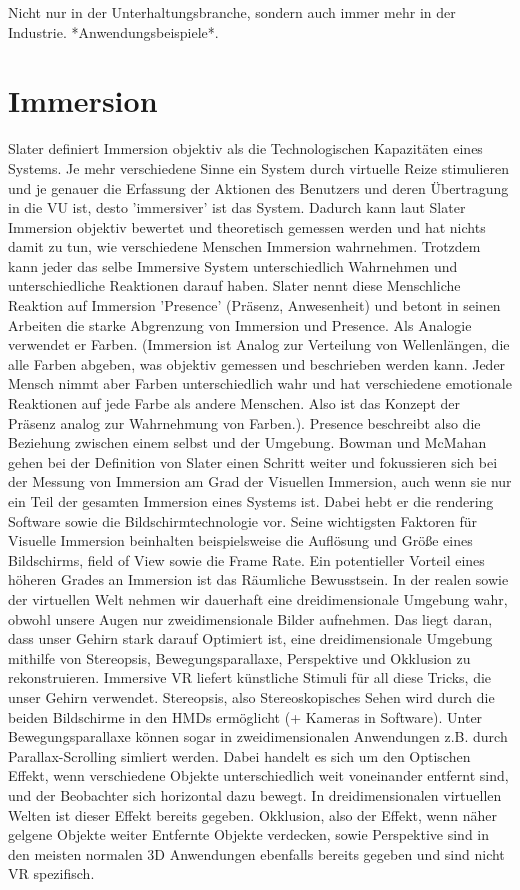 Nicht nur in der Unterhaltungsbranche, sondern auch immer mehr in der Industrie.\cite{Ragan2010} *Anwendungsbeispiele*.
 

\section{Immersion}
Slater\cite{Slater2003}\cite{Slater1999} definiert Immersion objektiv als die Technologischen Kapazitäten eines Systems. Je mehr verschiedene Sinne ein System durch virtuelle Reize stimulieren und je genauer die Erfassung der Aktionen des Benutzers und deren Übertragung in die VU ist, desto 'immersiver' ist das System. Dadurch kann laut Slater Immersion objektiv bewertet und theoretisch gemessen werden und hat nichts damit zu tun, wie verschiedene Menschen Immersion wahrnehmen. Trotzdem kann jeder das selbe Immersive System unterschiedlich Wahrnehmen und unterschiedliche Reaktionen darauf haben. Slater nennt diese Menschliche Reaktion auf Immersion 'Presence' (Präsenz, Anwesenheit) und betont in seinen Arbeiten die starke Abgrenzung von Immersion und Presence. Als Analogie verwendet er Farben. (Immersion ist Analog zur Verteilung von Wellenlängen, die alle Farben abgeben, was objektiv gemessen und beschrieben werden kann. Jeder Mensch nimmt aber Farben unterschiedlich wahr und hat verschiedene emotionale Reaktionen auf jede Farbe als andere Menschen. Also ist das Konzept der Präsenz analog zur Wahrnehmung von Farben.). Presence beschreibt also die Beziehung zwischen einem selbst und der Umgebung.
Bowman und McMahan\cite{Bowman2007} gehen bei der Definition von Slater einen Schritt weiter und fokussieren sich bei der Messung von Immersion am Grad der Visuellen Immersion, auch wenn sie nur ein Teil der gesamten Immersion eines Systems ist. Dabei hebt er die rendering Software sowie die Bildschirmtechnologie vor. Seine wichtigsten Faktoren für Visuelle Immersion beinhalten beispielsweise die Auflösung und Größe eines Bildschirms, field of View sowie die Frame Rate.
Ein potentieller Vorteil eines höheren Grades an Immersion ist das Räumliche Bewusstsein. In der realen sowie der virtuellen Welt nehmen wir dauerhaft eine dreidimensionale Umgebung wahr, obwohl unsere Augen nur zweidimensionale Bilder aufnehmen. Das liegt daran, dass unser Gehirn stark darauf Optimiert ist, eine dreidimensionale Umgebung mithilfe von Stereopsis, Bewegungsparallaxe, Perspektive und Okklusion zu rekonstruieren. 
Immersive VR liefert künstliche Stimuli für all diese Tricks, die unser Gehirn verwendet. Stereopsis, also Stereoskopisches Sehen wird durch die beiden Bildschirme in den HMDs ermöglicht (+ Kameras in Software). Unter Bewegungsparallaxe können sogar in zweidimensionalen Anwendungen z.B. durch Parallax-Scrolling simliert werden. Dabei handelt es sich um den Optischen Effekt, wenn verschiedene Objekte unterschiedlich weit voneinander entfernt sind, und der Beobachter sich horizontal dazu bewegt. In dreidimensionalen virtuellen Welten ist dieser Effekt bereits gegeben. Okklusion, also der Effekt, wenn näher gelgene Objekte weiter Entfernte Objekte verdecken, sowie Perspektive sind in den meisten normalen 3D Anwendungen ebenfalls bereits gegeben und sind nicht VR spezifisch.
